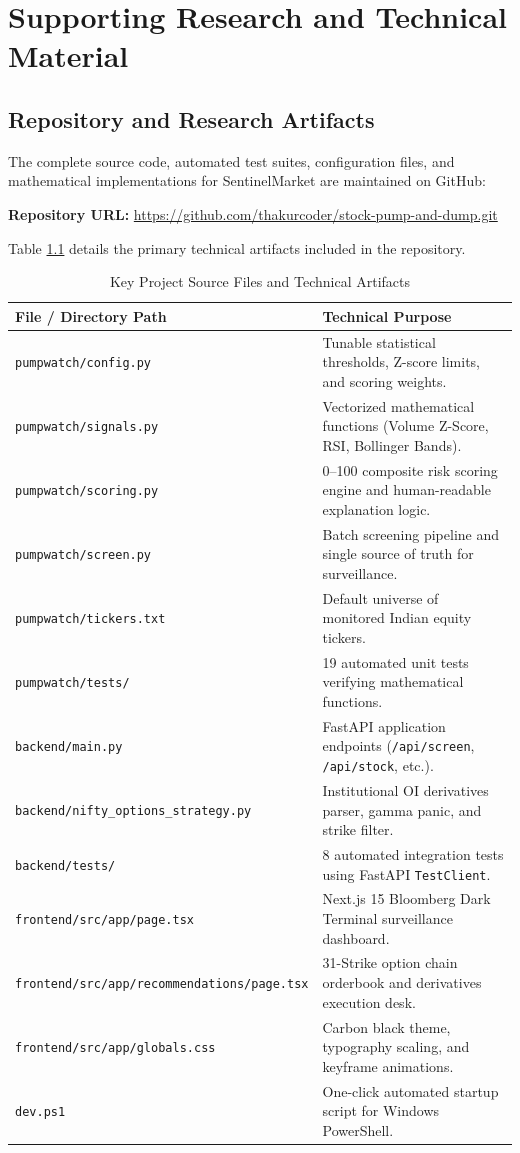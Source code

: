 \chapter{Supporting Research and Technical Material}

\section{Repository and Research Artifacts}
The complete source code, automated test suites, configuration files, and mathematical implementations for SentinelMarket are maintained on GitHub:
\begin{center}
\textbf{Repository URL:} \url{https://github.com/thakurcoder/stock-pump-and-dump.git}
\end{center}

\noindent Table \ref{tab:repo_artifacts} details the primary technical artifacts included in the repository.

\begin{table}[H]
\centering
\caption{Key Project Source Files and Technical Artifacts}
\label{tab:repo_artifacts}
\begin{tabularx}{\textwidth}{@{}lX@{}}
\toprule
\textbf{File / Directory Path} & \textbf{Technical Purpose} \\
\midrule
\texttt{pumpwatch/config.py} & Tunable statistical thresholds, Z-score limits, and scoring weights. \\
\texttt{pumpwatch/signals.py} & Vectorized mathematical functions (Volume Z-Score, RSI, Bollinger Bands). \\
\texttt{pumpwatch/scoring.py} & 0--100 composite risk scoring engine and human-readable explanation logic. \\
\texttt{pumpwatch/screen.py} & Batch screening pipeline and single source of truth for surveillance. \\
\texttt{pumpwatch/tickers.txt} & Default universe of monitored Indian equity tickers. \\
\texttt{pumpwatch/tests/} & 19 automated unit tests verifying mathematical functions. \\
\texttt{backend/main.py} & FastAPI application endpoints (\texttt{/api/screen}, \texttt{/api/stock}, etc.). \\
\texttt{backend/nifty\_options\_strategy.py} & Institutional OI derivatives parser, gamma panic, and strike filter. \\
\texttt{backend/tests/} & 8 automated integration tests using FastAPI \texttt{TestClient}. \\
\texttt{frontend/src/app/page.tsx} & Next.js 15 Bloomberg Dark Terminal surveillance dashboard. \\
\texttt{frontend/src/app/recommendations/page.tsx} & 31-Strike option chain orderbook and derivatives execution desk. \\
\texttt{frontend/src/app/globals.css} & Carbon black theme, typography scaling, and keyframe animations. \\
\texttt{dev.ps1} & One-click automated startup script for Windows PowerShell. \\
\bottomrule
\end{tabularx}
\end{table}

